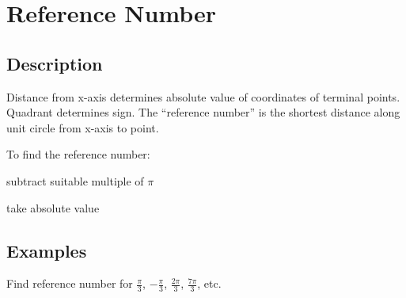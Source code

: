 \documentclass{exam}
\begin{document}
  \section{Reference Number}
  \subsection{Description}
  Distance from x-axis determines absolute value of coordinates of terminal points.  Quadrant determines sign.  The
  ``reference number'' is the shortest distance along unit circle from x-axis to point.

  To find the reference number:
  \begin{itemize*}
    \item subtract suitable multiple of $\pi$
    \item take absolute value
  \end{itemize*}

  \subsection{Examples}
  Find reference number for $\frac{\pi}{3}$, $- \frac{\pi}{3}$, $\frac{2 \pi}{3}$, $\frac{7 \pi}{3}$, etc.
\end{document}
